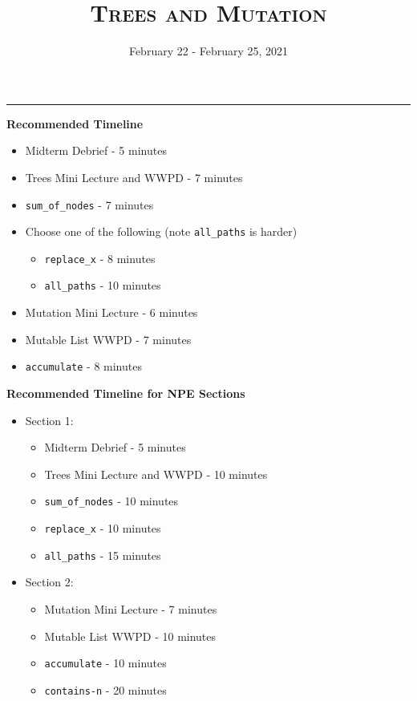 \documentclass{exam}
\title{\textsc{Trees and Mutation}}
\date{February 22 - February 25, 2021}
\begin{document}
\maketitle
\rule{\textwidth}{0.15em}
\fontsize{12}{15}\selectfont


\begin{guide}
    \textbf{Recommended Timeline}
    \begin{itemize}
        \item Midterm Debrief - 5 minutes
        \item Trees Mini Lecture and WWPD - 7 minutes
        \item \lstinline{sum_of_nodes} - 7 minutes
        \item Choose one of the following (note \lstinline{all_paths} is harder)
            \begin{itemize}
            \item \lstinline{replace_x} - 8 minutes
            \item \lstinline{all_paths} - 10 minutes
            \end{itemize}
        \item Mutation Mini Lecture - 6 minutes
        \item Mutable List WWPD - 7 minutes
        \item \lstinline{accumulate} - 8 minutes
    \end{itemize}
    \vspace{.5cm}
    \textbf{Recommended Timeline for NPE Sections}
    \begin{itemize}
        \item Section 1:
            \begin{itemize}
            \item Midterm Debrief - 5 minutes
            \item Trees Mini Lecture and WWPD - 10 minutes
            \item \lstinline{sum_of_nodes} - 10 minutes
            \item \lstinline{replace_x} - 10 minutes
            \item \lstinline{all_paths} - 15 minutes
            \end{itemize} 
        \item Section 2:
            \begin{itemize}
            \item Mutation Mini Lecture - 7 minutes
            \item Mutable List WWPD - 10 minutes
            \item \lstinline{accumulate} - 10 minutes
            \item \lstinline{contains-n} - 20 minutes
            \end{itemize}
    \end{itemize}
\end{guide}
\end{document}
